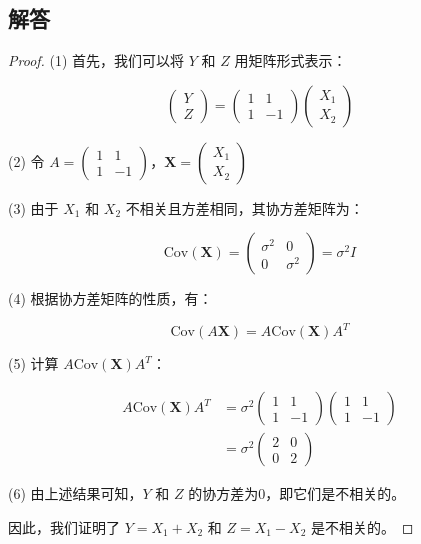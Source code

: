 \documentclass[UTF8]{report}
\theoremstyle{MyLineTheoremStyle} %
\theoremstyle{MyBlockTheoremStyle} %
\theoremstyle{MySubsubsectionStyle} %
\begin{document}
\subsection*{解答}
\begin{proof}
(1) 首先，我们可以将 $Y$ 和 $Z$ 用矩阵形式表示：

$$
\begin{pmatrix} Y \\ Z \end{pmatrix} = 
\begin{pmatrix} 1 & 1 \\ 1 & -1 \end{pmatrix}
\begin{pmatrix} X_1 \\ X_2 \end{pmatrix}
$$

(2) 令 $A = \begin{pmatrix} 1 & 1 \\ 1 & -1 \end{pmatrix}$，$\mathbf{X} = \begin{pmatrix} X_1 \\ X_2 \end{pmatrix}$

(3) 由于 $X_1$ 和 $X_2$ 不相关且方差相同，其协方差矩阵为：

$$
\text{Cov}(\mathbf{X}) = \begin{pmatrix} \sigma^2 & 0 \\ 0 & \sigma^2 \end{pmatrix} = \sigma^2I
$$

(4) 根据协方差矩阵的性质，有：

$$
\text{Cov}(A\mathbf{X}) = A\text{Cov}(\mathbf{X})A^T
$$

(5) 计算 $A\text{Cov}(\mathbf{X})A^T$：

$$
\begin{aligned}
A\text{Cov}(\mathbf{X})A^T &= \sigma^2\begin{pmatrix} 1 & 1 \\ 1 & -1 \end{pmatrix}
\begin{pmatrix} 1 & 1 \\ 1 & -1 \end{pmatrix} \\
&= \sigma^2\begin{pmatrix} 2 & 0 \\ 0 & 2 \end{pmatrix}
\end{aligned}
$$

(6) 由上述结果可知，$Y$ 和 $Z$ 的协方差为0，即它们是不相关的。

因此，我们证明了 $Y = X_1 + X_2$ 和 $Z = X_1 - X_2$ 是不相关的。
\end{proof}
\end{document}
